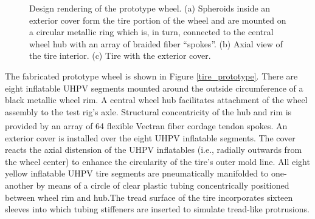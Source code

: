 \documentclass{article}
\begin{document}
\begin{figure}[hbt!]
\begin{minipage}{0.32\textwidth}
    \end{minipage}
    \caption{Design rendering of the prototype wheel. (a) Spheroids inside an exterior cover form the tire portion of the wheel and are mounted on a circular metallic ring which is, in turn, connected to the central wheel hub with an array of braided fiber “spokes”. (b) Axial view of the tire interior. (c) Tire with the exterior cover.}
    \label{tire_design}
\end{figure}

The fabricated prototype wheel is shown in Figure \ref{tire_prototype}. There are eight inflatable UHPV segments mounted around the outside circumference of a black metallic wheel rim. A central wheel hub facilitates attachment of the wheel assembly to the test rig's axle. Structural concentricity of the hub and rim is provided by an array of 64 flexible Vectran\textsuperscript{\textregistered} fiber cordage tendon spokes. An exterior cover is installed over the eight UHPV inflatable segments. The cover reacts the axial distension of the UHPV inflatables (i.e., radially outwards from the wheel center) to enhance the circularity of the tire's outer mold line. All eight yellow inflatable UHPV tire segments are pneumatically manifolded to one-another by means of a circle of clear plastic tubing concentrically positioned between wheel rim and hub.The tread surface of the tire incorporates sixteen sleeves into which tubing stiffeners are inserted to simulate tread-like protrusions. 
\end{document}
